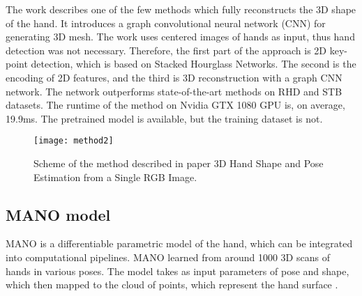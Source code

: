 The work \cite{23} describes one of the few methods which fully reconstructs the 3D shape of the hand. It introduces a graph convolutional neural network (CNN) for generating 3D mesh. The work uses centered images of hands as input, thus hand detection was not necessary. Therefore, the first part of the approach is 2D key-point detection, which is based on Stacked Hourglass Networks. The second is the encoding of 2D features, and the third is 3D reconstruction with a graph CNN network. The network outperforms state-of-the-art methods on RHD \cite{13} and STB \cite{14} datasets. The runtime of the method on Nvidia GTX 1080 GPU is, on average, 19.9ms. The pretrained model is available, but the training dataset is not.

\begin{figure}
\caption{Scheme of the method described in paper 3D Hand Shape and Pose Estimation from a Single RGB Image. \cite{23}}
\centering
\texttt{[image: method2]}
\end{figure}

\subsection{MANO model}

MANO is a differentiable parametric model of the hand, which can be integrated into computational pipelines. MANO learned from around 1000 3D scans of hands in various poses. The model takes as input parameters of pose and shape, which then mapped to the cloud of points, which represent the hand surface \cite{MANO:SIGGRAPHASIA:2017}.